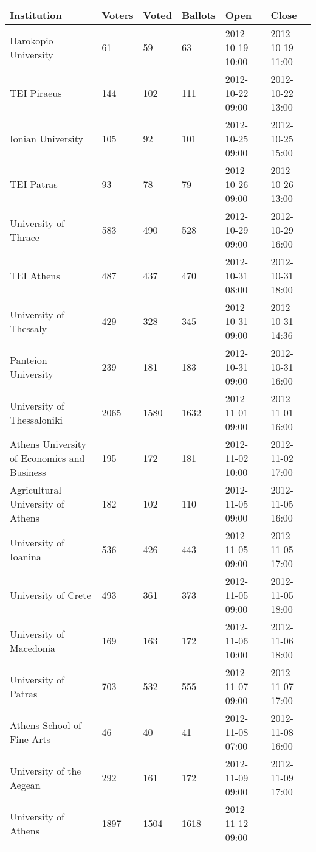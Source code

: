 \documentclass[letterpaper,twocolumn,10pt]{article}
\begin{document}
\begin{table*}[t]
  \begin{threeparttable}
    \begin{tabular}{llllll}
      \hline
      Institution & Voters & Voted & Ballots & Open & Close\\
      \hline
      Harokopio University & 61 & 59 & 63 & 2012-10-19 10:00 & 2012-10-19 11:00\\
      TEI Piraeus & 144 & 102 & 111 & 2012-10-22 09:00 & 2012-10-22 13:00\\
      Ionian University & 105 & 92 & 101 & 2012-10-25 09:00 & 2012-10-25 15:00\\
      TEI Patras & 93 & 78 & 79 & 2012-10-26 09:00 & 2012-10-26 13:00\\
      University of Thrace & 583 & 490 & 528 & 2012-10-29 09:00 & 
      2012-10-29 16:00\\
      TEI Athens & 487 & 437 & 470 & 2012-10-31 08:00 & 2012-10-31 18:00\\
      University of Thessaly & 429 & 328 & 345 & 2012-10-31 09:00 & 
      2012-10-31 14:36\\
      Panteion University & 239 & 181 & 183 & 2012-10-31 09:00 & 
      2012-10-31 16:00\\
      University of Thessaloniki & 2065 & 1580 & 1632 & 2012-11-01 09:00 
      & 2012-11-01 16:00\\
      Athens University of Economics and Business & 195 & 172 & 181 & 
      2012-11-02 10:00 & 2012-11-02 17:00\\
      Agricultural University of Athens & 182 & 102 & 110 
      & 2012-11-05 09:00 & 2012-11-05 16:00\\
      University of Ioanina & 536 & 426 & 443 & 2012-11-05 09:00 &
      2012-11-05 17:00\\
      University of Crete & 493 & 361 & 373 & 2012-11-05 09:00 & 
      2012-11-05 18:00\\
      University of Macedonia & 169 & 163 & 172 & 2012-11-06 10:00 & 
      2012-11-06 18:00\\
      University of Patras & 703 & 532 & 555 & 2012-11-07 09:00 & 
      2012-11-07 17:00\\
      Athens School of Fine Arts & 46 & 40 & 41 & 2012-11-08 07:00 & 
      2012-11-08 16:00\\
      University of the Aegean & 292 & 161 & 172 & 2012-11-09 09:00 & 
      2012-11-09 17:00\\
      University of Athens & 1897 & 1504 & 1618 & 2012-11-12 09:00 & 

\end{tabular}
\end{threeparttable}
\end{table*}
\end{document}
